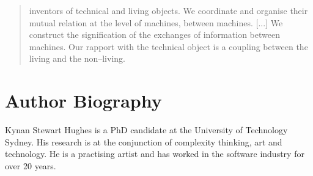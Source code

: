 \documentclass[letter:wpaper]{article}
\begin{document}
    \begin{quote}
        inventors of technical and living objects. We coordinate and organise their mutual relation at the level of machines, between machines. [...] We construct the signification of the exchanges of information between machines. Our rapport with the technical object is a coupling between the living and the non–living. \citep[p.xvi]{SimondonOnThMdOfExstncOfTechnclObjcts1980}
    \end{quote}
    



\section{Author Biography}

Kynan Stewart Hughes is a PhD candidate at the University of Technology Sydney. His research is at the conjunction of complexity thinking, art and technology. He is a practising artist and has worked in the software industry for over 20 years. 
\end{document}

